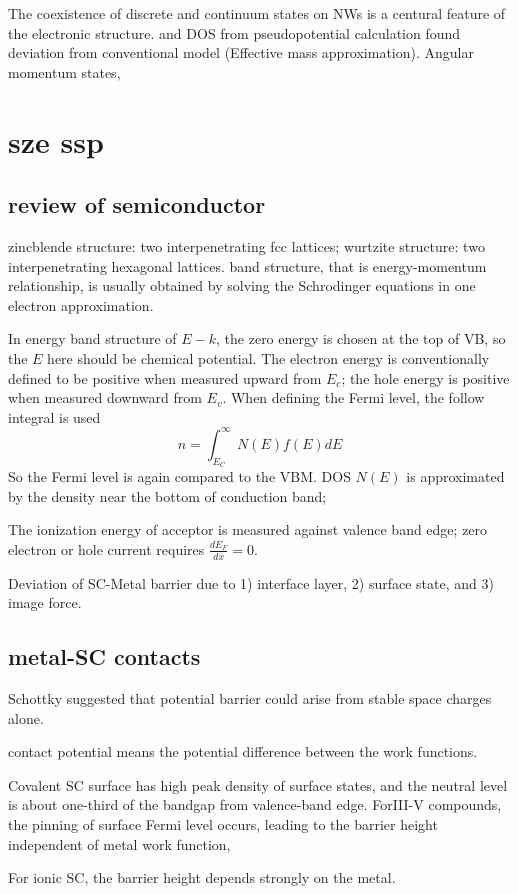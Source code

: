 The coexistence of discrete and continuum states on NWs is a centural feature of the electronic structure.  and DOS from pseudopotential calculation found deviation from conventional model (Effective mass approximation). Angular momentum states,  \cite{Wang2014n}


\section{sze ssp}
\subsection{review of semiconductor}
zincblende structure: two interpenetrating fcc lattices; wurtzite structure: two interpenetrating hexagonal lattices. band structure, that is energy-momentum relationship, is usually obtained by solving the Schrodinger equations in one electron approximation. 


In energy band structure of $E-k$, the zero energy is chosen at the top of VB, so the $E$ here should be chemical potential.\cite{Sze2006} The electron energy is conventionally defined to be positive when measured upward from $E_c$; the hole energy is positive when measured downward from $E_v$. When defining the Fermi level, the follow integral is used
\[
n = \int_{E_C}^\infty N(E)f(E)dE
\]
So the Fermi level is again compared to the VBM. DOS $N(E)$ is approximated by the density near the bottom of conduction band; 

The ionization energy of acceptor is measured against valence band edge;
zero electron or hole current requires $\frac{dE_F}{dx} = 0$. 

Deviation of SC-Metal barrier due to 1) interface layer, 2) surface state, and 3) image force. 


\subsection{metal-SC contacts}

Schottky suggested that potential barrier could arise from stable space charges alone. 

contact potential means the potential difference between the work functions. 

Covalent SC surface has high peak density of surface states, and the neutral level is about one-third of the bandgap from valence-band edge. ForIII-V compounds, the pinning of surface Fermi level occurs, leading to the barrier height independent of metal work function, 

For ionic SC, the barrier height depends strongly on the metal. 



























